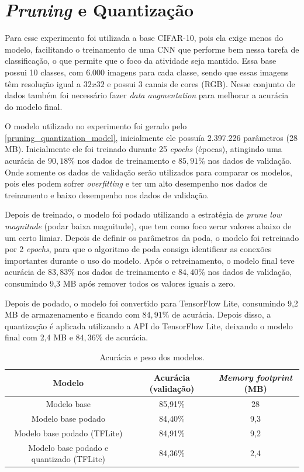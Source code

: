 \section{\textit{Pruning} e Quantização}

Para esse experimento foi utilizada a base CIFAR-10, pois ela exige menos do modelo, facilitando o treinamento de uma
CNN que performe bem nessa tarefa de classificação, o que permite que o foco da atividade seja mantido.
Essa base possui 10 classes, com  6.000 imagens para cada classe, sendo que essas imagens têm resolução igual a
$32x32$ e possui 3 canais de cores (RGB). Nesse conjunto de dados também foi necessário fazer
\textit{data augmentation} para melhorar a acurácia do modelo final.

O modelo utilizado no experimento foi gerado pelo \autoref{pruning_quantization_model}, inicialmente ele possuía
2.397.226 parâmetros (28 MB). Inicialmente ele foi treinado durante 25 \textit{epochs} (épocas), atingindo
uma acurácia de $90,18\%$ nos dados de treinamento e $85,91\%$ nos dados de validação.
Onde somente os dados de validação serão utilizados para comparar os modelos, pois eles podem sofrer
\textit{overfitting} e ter um alto desempenho nos dados de treinamento e baixo desempenho nos dados de validação.

Depois de treinado, o modelo foi podado utilizando a estratégia de \textit{prune low magnitude}
(podar baixa magnitude), que tem como foco zerar valores abaixo de um certo limiar. Depois de definir os parâmetros da
poda, o modelo foi retreinado por 2 \textit{epochs}, para que o algoritmo de poda consiga identificar as conexões
importantes durante o uso do modelo.
Após o retreinamento, o modelo final teve acurácia de $83,83\%$ nos dados de treinamento e $84,40\%$ nos dados de
validação, consumindo 9,3 MB após remover todos os valores iguais a zero.

Depois de podado, o modelo foi convertido para TensorFlow Lite, consumindo 9,2 MB de armazenamento e ficando com
$84,91\%$ de acurácia. Depois disso, a quantização é aplicada utilizando a API do TensorFlow Lite, deixando o modelo
final com 2,4 MB e $84,36\%$ de acurácia.

\begin{center}
\begin{table}[htb]
\centering
\ABNTEXfontereduzida
\caption[Acurácia e peso dos modelos]{Acurácia e peso dos modelos.}
\label{tabela_acuracia_peso}
\begin{tabular}{ |c|c|c| }
	\hline
	\textbf{Modelo} & \textbf{Acurácia (validação)}  & \textbf{\textit{Memory footprint} (MB)} \\
	\hline
	Modelo base 				 & 	85,91\% 	& 	28	\\
	Modelo base podado 			 & 	84,40\% 	& 	9,3	\\
	Modelo base podado (TFLite) 		 & 	84,91\% 	& 	9,2	\\
	Modelo base podado e quantizado (TFLite) & 	84,36\% 	& 	2,4	\\
	\hline
\end{tabular}
\end{table}
\end{center}

